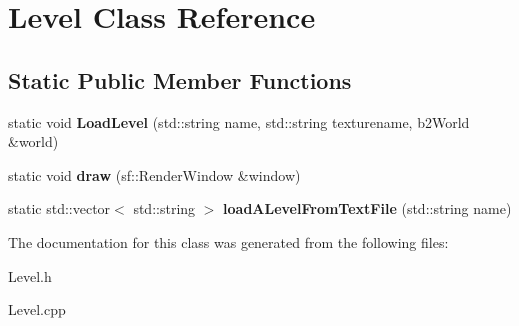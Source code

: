 \hypertarget{class_level}{}\section{Level Class Reference}
\label{class_level}
\subsection*{Static Public Member Functions}
\begin{DoxyCompactItemize}
\item 
static void {\bfseries Load\+Level} (std\+::string name, std\+::string texturename, b2\+World \&world)\hypertarget{class_level_aa4f63fa831c8a6fdce8a3374d8e61e57}{}\label{class_level_aa4f63fa831c8a6fdce8a3374d8e61e57}

\item 
static void {\bfseries draw} (sf\+::\+Render\+Window \&window)\hypertarget{class_level_a20d356fa84aac7c21b39c631882642a6}{}\label{class_level_a20d356fa84aac7c21b39c631882642a6}

\item 
static std\+::vector$<$ std\+::string $>$ {\bfseries load\+A\+Level\+From\+Text\+File} (std\+::string name)\hypertarget{class_level_af24776e57d1161e1d67c32893f9bebf7}{}\label{class_level_af24776e57d1161e1d67c32893f9bebf7}

\end{DoxyCompactItemize}


The documentation for this class was generated from the following files\+:\begin{DoxyCompactItemize}
\item 
Level.\+h\item 
Level.\+cpp\end{DoxyCompactItemize}
